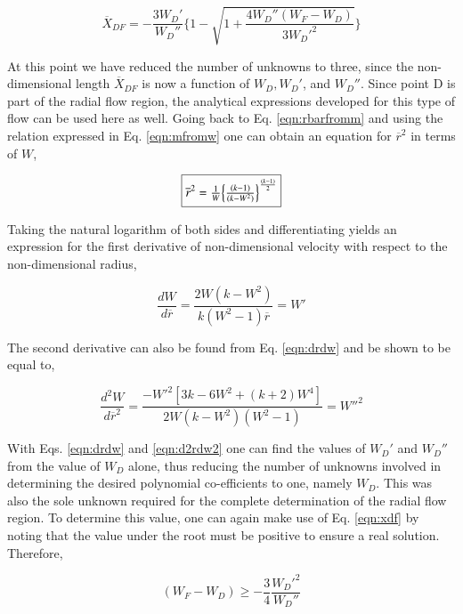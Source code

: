 \begin{equation}
	\overline{X}_{DF} = -\frac{3W_D'}{W_D''}\Big\{1 - \sqrt{1 + \frac{4W_D''(W_F-W_D)}
	{3W_D'^2}}\Big\}
\label{eqn:xdf}
\end{equation}

	At this point we have reduced the number of unknowns to three, since the non-dimensional 
length $\overline{X}_{DF}$ is now a function of $W_D, W_D'$, and $W_D''$.  Since point
D is part of the radial flow region, the analytical expressions developed for this type of
flow can be used here as well.  Going back to Eq. \ref{eqn:rbarfromm} and using the relation
expressed in Eq. \ref{eqn:mfromw} one can obtain an equation for
$\overline{r}^2$ in terms of $W$,

\begin{equation}
	\fbox{$
	\overline{r}^2 = \frac{1}{W}\Big\{\frac{(k-1)}{(k-W^2)}\Big\}^{\frac{(k-1)}{2}}
	$}
\label{rbarfromw}
\end{equation}

	Taking the natural logarithm of both sides and differentiating yields
an expression for the first derivative of non-dimensional velocity
with respect to the non-dimensional radius,

\begin{equation}
	\frac{dW}{d\overline{r}}=\frac{2W(k-W^2)}{k(W^2-1)\overline{r}}=W'
\label{eqn:drdw}
\end{equation}
	
	The second derivative can also be found from Eq. \ref{eqn:drdw} and
be shown to be equal to,

\begin{equation}
	\frac{d^2W}{d\overline{r}^2}=\frac{-W'^2[3k-6W^2+(k+2)W^4]}{2W(k-W^2)(W^2-1)} = W''^2
\label{eqn:d2rdw2}
\end{equation}

	With Eqs. \ref{eqn:drdw} and \ref{eqn:d2rdw2} one can find the values of $W_D'$ and 
$W_D''$ from the value of $W_D$ alone, thus reducing the number of unknowns involved in determining
the desired polynomial co-efficients to one, namely $W_D$.  This was also the sole unknown required 
for the complete determination of the radial flow region.  To determine this value, one can
again make use of Eq. \ref{eqn:xdf} by noting that the value under the root must be positive to
ensure a real solution.  Therefore,

\begin{equation}
	(W_F - W_D)\geq-\frac{3}{4}\frac{W_D'^2}{W_D''}
\label{eqn:wdiff}
\end{equation}

